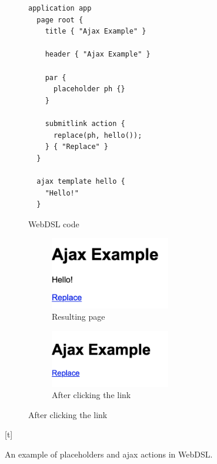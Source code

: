       \begin{figure}
        \begin{subfigure}[t]{0.45\textwidth}
          \begin{verbatim}
application app
  page root {
    title { "Ajax Example" }

    header { "Ajax Example" }

    par {
      placeholder ph {}
    }

    submitlink action {
      replace(ph, hello());
    } { "Replace" }
  }

  ajax template hello {
    "Hello!"
  }
          \end{verbatim}
          \caption{\label{fig:webdsl-ajax-webdsl}WebDSL code}
        \end{subfigure}
        \begin{subfigure}[t]{0.55\textwidth}
        \begin{subfigure}[t]{1\textwidth}
          \capstart
          \includegraphics[width=0.75\textwidth]{../img/webdsl-ajax-1}
          \caption{\label{fig:webdsl-ajax-page-1}Resulting page}
        \end{subfigure}
        \begin{subfigure}[t]{1\textwidth}
          \capstart
          \includegraphics[width=0.75\textwidth]{../img/webdsl-ajax-2}
          \caption{\label{fig:webdsl-ajax-page-2}After clicking the link}
        \end{subfigure}
      \end{subfigure}[t]
      \caption{\label{fig:webdsl-ajax}An example of placeholders and ajax actions in WebDSL.}
      \end{figure}

